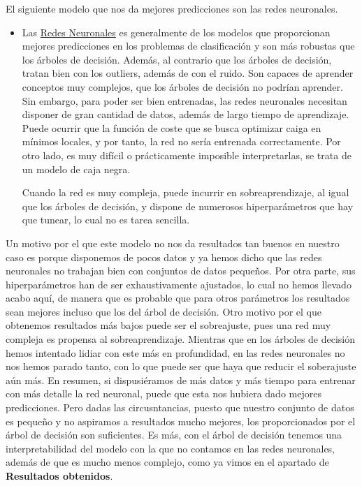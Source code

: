 \documentclass[a4paper,11pt]{article}
\begin{document}
El siguiente modelo que nos da mejores predicciones son las redes neuronales.
\begin{itemize}
	\item Las \underline{Redes Neuronales} es generalmente de los modelos que proporcionan mejores predicciones  en los problemas de clasificación y son más robustas que los árboles de decisión. Además, al contrario que los árboles de decisión, tratan bien con los outliers, además de con el ruido. Son capaces de aprender conceptos muy complejos, que los árboles de decisión no podrían aprender. Sin embargo, para poder ser bien entrenadas, las redes neuronales necesitan disponer de gran cantidad de datos, además de largo tiempo de aprendizaje. Puede ocurrir que la función de coste que se busca optimizar caiga en mínimos locales, y por tanto, la red no sería entrenada correctamente. Por otro lado, es muy difícil o prácticamente imposible interpretarlas, se trata de un modelo de caja negra. 
	
	Cuando la red es muy compleja, puede incurrir en sobreaprendizaje, al igual que los árboles de decisión, y dispone de numerosos hiperparámetros que hay que tunear, lo cual no es tarea sencilla. 
\end{itemize}

Un motivo por el que este modelo no nos da resultados tan buenos en nuestro caso es porque disponemos de pocos datos y ya hemos dicho que las redes neuronales no trabajan bien con conjuntos de datos pequeños. Por otra parte, sus hiperparámetros han de ser exhaustivamente ajustados, lo cual no hemos llevado acabo aquí, de manera que es probable que para otros parámetros los resultados sean mejores incluso que los del árbol de decisión. Otro motivo por el que obtenemos resultados más bajos puede ser el sobreajuste, pues una red  muy compleja es propensa al sobreaprendizaje. Mientras que en los árboles de decisión hemos intentado lidiar con este más en profundidad, en las redes neuronales no nos hemos parado tanto, con lo que puede ser que haya que reducir el soberajuste aún más. En resumen, si dispusiéramos de más datos y más tiempo para entrenar con más detalle la red neuronal, puede que esta nos hubiera dado mejores predicciones. Pero dadas las circusntancias, puesto que nuestro conjunto de datos es pequeño y no aspiramos a resultados mucho mejores, los proporcionados por el árbol de decisión son suficientes. Es más, con el árbol de decisión tenemos una interpretabilidad del modelo con la que no contamos en las redes neuronales, además de que es mucho menos complejo, como ya vimos en el apartado de \textbf{Resultados obtenidos}.
\end{document}
